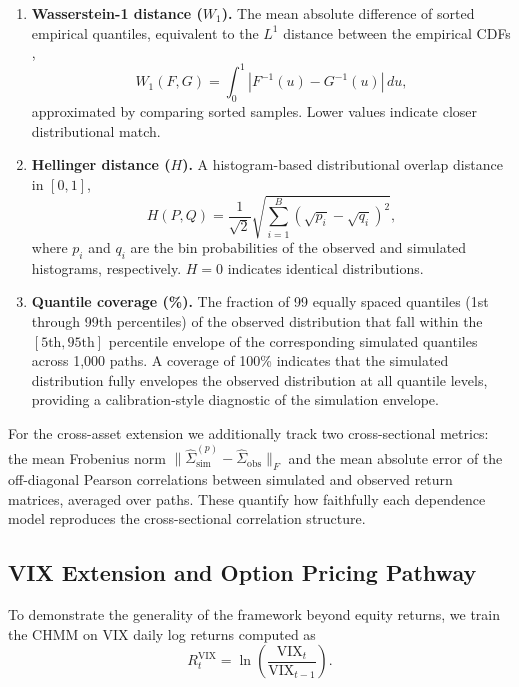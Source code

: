 \begin{enumerate}
    \item \textbf{Wasserstein-1 distance ($W_1$).}
    The mean absolute difference of sorted empirical quantiles, equivalent to the $L^1$ distance between the empirical CDFs \cite{glasserman2003monte},
    \begin{equation}
        W_1(F, G) = \int_0^1 |F^{-1}(u) - G^{-1}(u)|\,du,
        \label{eq:wasserstein}
    \end{equation}
    approximated by comparing sorted samples.
    Lower values indicate closer distributional match.

    \item \textbf{Hellinger distance ($H$).}
    A histogram-based distributional overlap distance in $[0,1]$,
    \begin{equation}
        H(P, Q) = \frac{1}{\sqrt{2}} \sqrt{\sum_{i=1}^{B} \left(\sqrt{p_i} - \sqrt{q_i}\right)^2},
        \label{eq:hellinger}
    \end{equation}
    where $p_i$ and $q_i$ are the bin probabilities of the observed and simulated histograms, respectively.
    $H = 0$ indicates identical distributions.

    \item \textbf{Quantile coverage (\%).}
    The fraction of 99 equally spaced quantiles (1st through 99th percentiles) of the observed distribution that fall within the $[5\text{th}, 95\text{th}]$ percentile envelope of the corresponding simulated quantiles across 1{,}000 paths.
    A coverage of 100\% indicates that the simulated distribution fully envelopes the observed distribution at all quantile levels, providing a calibration-style diagnostic of the simulation envelope.
\end{enumerate}

For the cross-asset extension we additionally track two cross-sectional metrics: the mean Frobenius norm $\|\hat{\Sigma}_{\text{sim}}^{(p)} - \hat{\Sigma}_{\text{obs}}\|_F$ and the mean absolute error of the off-diagonal Pearson correlations between simulated and observed return matrices, averaged over paths.
These quantify how faithfully each dependence model reproduces the cross-sectional correlation structure.

\subsection{VIX Extension and Option Pricing Pathway}
\label{sec:vix_methods}

To demonstrate the generality of the framework beyond equity returns, we train the CHMM on VIX daily log returns computed as
\begin{equation}
    R_t^{\text{VIX}} = \ln\!\left(\frac{\text{VIX}_t}{\text{VIX}_{t-1}}\right).
    \label{eq:vix_returns}
\end{equation}

